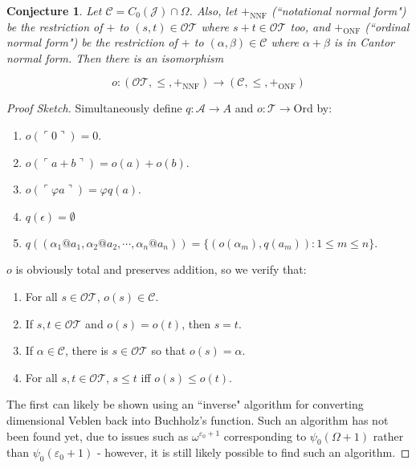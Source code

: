 \documentclass{article}
\theoremstyle{definition}
\theoremstyle{plain}
\theoremstyle{plain}
\newtheorem{conjecture}[definition]{Conjecture}
\theoremstyle{plain}
\theoremstyle{plain}
\theoremstyle{remark}
\theoremstyle{remark}
\theoremstyle{remark}
\theoremstyle{plain}
\theoremstyle{plain}
\begin{document}
\begin{conjecture}
Let $\mathcal{C} = C_0(\mathcal{J}) \cap \Omega$. Also, let $+_{\mathrm{NNF}}$ (``notational normal form") be the restriction of $+$ to $(s,t) \in \mathcal{OT}$ where $s + t \in \mathcal{OT}$ too, and $+_{\mathrm{ONF}}$ (``ordinal normal form") be the restriction of $+$ to $(\alpha, \beta) \in \mathcal{C}$ where $\alpha + \beta$ is in Cantor normal form. Then there is an isomorphism

\begin{equation}
o: (\mathcal{OT}, \leq, +_{\mathrm{NNF}}) \longrightarrow (\mathcal{C}, \leq, +_{\mathrm{ONF}})
\end{equation}

\end{conjecture}

\begin{proof}[Proof Sketch]
Simultaneously define $q: \mathcal{A} \to A$ and $o: \mathcal{T} \to \mathrm{Ord}$ by:

\begin{enumerate}
    \item $o(\ulcorner 0 \urcorner) = 0$.
    \item $o(\ulcorner a+b \urcorner) = o(a)+o(b)$.
    \item $o(\ulcorner \varphi a \urcorner) = \varphi q(a)$.
    \item $q(\epsilon) = \emptyset$
    \item $q((\alpha_1 @ a_1, \alpha_2 @ a_2, \cdots, \alpha_n @ a_n)) = \{(o(\alpha_m), q(a_m)): 1 \leq m \leq n\}$.
\end{enumerate}

$o$ is obviously total and preserves addition, so we verify that:

\begin{enumerate}
    \item For all $s \in \mathcal{OT}$, $o(s) \in \mathcal{C}$.
    \item If $s, t \in \mathcal{OT}$ and $o(s) = o(t)$, then $s = t$.
    \item If $\alpha \in \mathcal{C}$, there is $s \in \mathcal{OT}$ so that $o(s) = \alpha$.
    \item For all $s, t \in \mathcal{OT}$, $s \leq t$ iff $o(s) \leq o(t)$.
\end{enumerate}

The first can likely be shown using an ``inverse" algorithm for converting dimensional Veblen back into Buchholz's function. Such an algorithm has not been found yet, due to issues such as $\omega^{\varepsilon_0+1}$ corresponding to $\psi_0(\Omega+1)$ rather than $\psi_0(\varepsilon_0+1)$ - however, it is still likely possible to find such an algorithm.


\end{proof}
\end{document}
